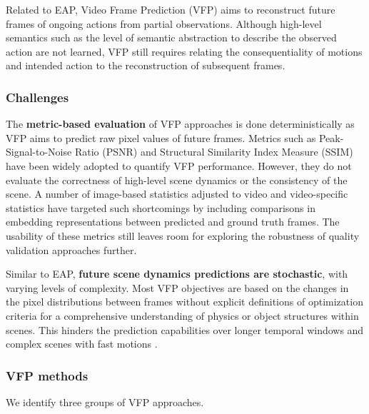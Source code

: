 Related to EAP, Video Frame Prediction (VFP) aims to reconstruct future frames of ongoing actions from partial observations. Although high-level semantics such as the level of semantic abstraction to describe the observed action are not learned, VFP still requires relating the consequentiality of motions and intended action to the reconstruction of subsequent frames.

\subsubsection{Challenges}
\label{sec:prediction::VFP:::challenges}


The \textbf{metric-based evaluation} of VFP approaches is done deterministically as VFP aims to predict raw pixel values of future frames. Metrics such as Peak-Signal-to-Noise Ratio (PSNR) and Structural Similarity Index Measure (SSIM) have been widely adopted to quantify VFP performance. However, they do not evaluate the correctness of high-level scene dynamics or the consistency of the scene. A number of image-based statistics adjusted to video  and video-specific statistics  have targeted such shortcomings by including comparisons in embedding representations between predicted and ground truth frames. The usability of these metrics still leaves room for exploring the robustness of quality validation approaches further.

Similar to EAP, \textbf{future scene dynamics predictions are stochastic}, with varying levels of complexity. Most VFP objectives are based on the changes in the pixel distributions between frames without explicit definitions of optimization criteria for a comprehensive understanding of physics or object structures within scenes. This hinders the prediction capabilities over longer temporal windows and complex scenes with fast motions .


\subsubsection{VFP methods}
\label{sec:prediction::VFP:::methods}

We identify three groups of VFP approaches.

